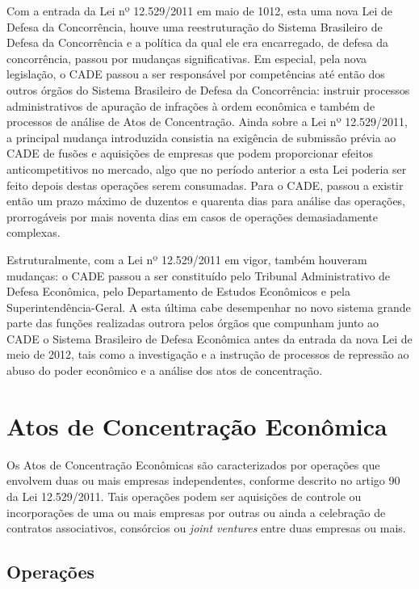 \documentclass[11pt]{report}
\begin{document}
Com a entrada da Lei nº 12.529/2011 em maio de 1012, esta uma nova Lei de Defesa da Concorrência, houve uma reestruturação do Sistema Brasileiro de Defesa da Concorrência e a política
da qual ele era encarregado, de defesa da concorrência, passou por mudanças significativas. Em especial, pela nova legislação, o CADE passou a ser responsável por competências até
então dos outros órgãos do Sistema Brasileiro de Defesa da Concorrência: instruir processos administrativos de apuração de infrações à ordem econômica e também de processos de análise
de Atos de Concentração. Ainda sobre a Lei nº 12.529/2011, a principal mudança introduzida consistia na exigência de submissão
prévia ao CADE de fusões e aquisições de empresas que podem proporcionar efeitos anticompetitivos no mercado, algo que no período anterior a esta Lei poderia ser feito depois destas
operações serem consumadas. Para o CADE, passou a existir então um prazo máximo de duzentos e quarenta dias para análise das operações, prorrogáveis por mais noventa dias
em casos de operações demasiadamente complexas.

Estruturalmente, com a Lei nº 12.529/2011 em vigor, também houveram mudanças: o CADE passou a ser constituído pelo Tribunal Administrativo de Defesa Econômica, pelo Departamento de
Estudos Econômicos e pela Superintendência-Geral. A esta última cabe desempenhar no novo sistema grande parte das funções realizadas outrora pelos órgãos que compunham junto
ao CADE o Sistema Brasileiro de Defesa Econômica antes da entrada da nova Lei de meio de 2012, tais como a investigação e a instrução de processos de repressão ao abuso do poder
econômico e a análise dos atos de concentração.

\section{Atos de Concentração Econômica}

\indent\indent Os Atos de Concentração Econômicas são caracterizados por operações que envolvem duas ou mais empresas independentes, conforme descrito no artigo 90 da Lei 12.529/2011. Tais operações
podem ser aquisições de controle ou incorporações de uma ou mais empresas por outras ou ainda a celebração de contratos associativos, consórcios ou \textit{joint ventures} entre duas
empresas ou mais.

\subsection{Operações}
\end{document}
